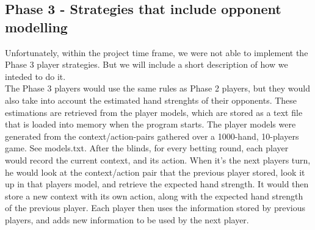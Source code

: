 \documentclass[titlepage]{article}
\begin{document}
	\subsection{Phase 3 - Strategies that include opponent modelling}
	    Unfortunately, within the project time frame, we were not able to implement the Phase 3 player strategies. But we will include a short description of how we inteded to do it. \\ The Phase 3 players would use the same rules as Phase 2 players, but they would also take into account the estimated hand strenghts of their opponents. These estimations are retrieved from the player models, which are stored as a text file that is loaded into memory when the program starts. The player models were generated from the context/action-pairs gathered over a 1000-hand, 10-players game. See models.txt. After the blinds, for every betting round, each player would record the current context, and its action. When it's the next players turn, he would look at the context/action pair that the previous player stored, look it up in that players model, and retrieve the expected hand strength. It would then store a new context with its own action, along with the expected hand strength of the previous player. Each player then uses the information stored by previous players, and adds new information to be used by the next player.
		
\end{document}
